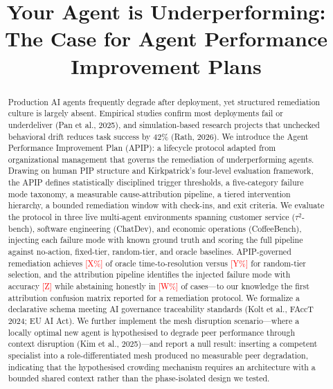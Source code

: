 \documentclass[conference]{IEEEtran}
\newcommand{\pending}[1]{\textcolor{red}{[#1]}}
\newcommand{\ttrOraclePct}{\pending{X\%}}        %
\newcommand{\ttrRandomPct}{\pending{Y\%}}        %
\newcommand{\attrAccuracy}{\pending{Z}}          %
\newcommand{\attrAbstention}{\pending{W\%}}      %
\begin{document}
\title{Your Agent is Underperforming:\\
The Case for Agent Performance Improvement Plans}

\author{
}

\maketitle

\begin{abstract}
Production AI agents frequently degrade after deployment, yet structured
remediation culture is largely absent. Empirical studies confirm most
deployments fail or underdeliver (Pan et al., 2025), and simulation-based
research projects that unchecked behavioral drift reduces task success by
42\% (Rath, 2026). We introduce the Agent Performance Improvement Plan
(APIP): a lifecycle protocol adapted from organizational management that
governs the remediation of underperforming agents. Drawing on human PIP
structure and Kirkpatrick's four-level evaluation framework, the APIP defines
statistically disciplined trigger thresholds, a five-category failure mode
taxonomy, a measurable cause-attribution pipeline, a tiered intervention
hierarchy, a bounded remediation window with check-ins, and exit criteria. We
evaluate the protocol in three live multi-agent environments spanning customer
service ($\tau^2$-bench), software engineering (ChatDev), and economic
operations (CoffeeBench), injecting each failure mode with known ground truth
and scoring the full pipeline against no-action, fixed-tier, random-tier, and
oracle baselines. APIP-governed remediation achieves \ttrOraclePct{} of oracle
time-to-resolution versus \ttrRandomPct{} for random-tier selection, and the
attribution pipeline identifies the injected failure mode with accuracy
\attrAccuracy{} while abstaining honestly in \attrAbstention{} of cases---to
our knowledge the first attribution confusion matrix reported for a
remediation protocol. We formalize a declarative schema meeting AI governance
traceability standards (Kolt et al., FAccT 2024; EU AI Act). We further
implement the mesh disruption scenario---where a locally optimal new agent is
hypothesised to degrade peer performance through context disruption (Kim et
al., 2025)---and report a null result: inserting a competent specialist into a
role-differentiated mesh produced no measurable peer degradation, indicating
that the hypothesised crowding mechanism requires an architecture with a
bounded shared context rather than the phase-isolated design we tested.
\end{abstract}
\end{document}
